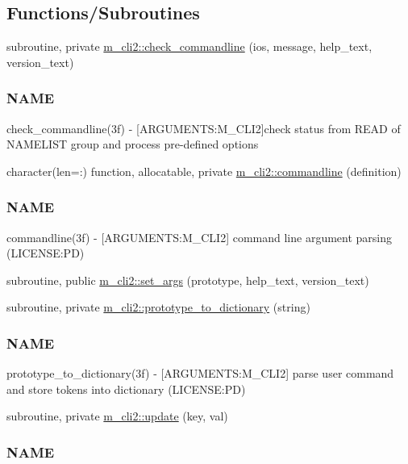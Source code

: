 \subsection*{Functions/\+Subroutines}
\begin{DoxyCompactItemize}
\item 
subroutine, private \mbox{\hyperlink{namespacem__cli2_a02d4639b325d1b8c6fd3b03ba515f2b3}{m\+\_\+cli2\+::check\+\_\+commandline}} (ios, message, help\+\_\+text, version\+\_\+text)
\begin{DoxyCompactList}\small\item\em \subsubsection*{N\+A\+ME}

check\+\_\+commandline(3f) -\/ \mbox{[}A\+R\+G\+U\+M\+E\+N\+TS\+:M\+\_\+\+C\+L\+I2\mbox{]}check status from R\+E\+AD of N\+A\+M\+E\+L\+I\+ST group and process pre-\/defined options \end{DoxyCompactList}\item 
character(len=\+:) function, allocatable, private \mbox{\hyperlink{namespacem__cli2_a85c38a938a7dd9a749daf8effe45c109}{m\+\_\+cli2\+::commandline}} (definition)
\begin{DoxyCompactList}\small\item\em \subsubsection*{N\+A\+ME}

commandline(3f) -\/ \mbox{[}A\+R\+G\+U\+M\+E\+N\+TS\+:M\+\_\+\+C\+L\+I2\mbox{]} command line argument parsing (L\+I\+C\+E\+N\+SE\+:PD) \end{DoxyCompactList}\item 
subroutine, public \mbox{\hyperlink{namespacem__cli2_a6d20994aa80217dd3d0ffd1d5586f736}{m\+\_\+cli2\+::set\+\_\+args}} (prototype, help\+\_\+text, version\+\_\+text)
\item 
subroutine, private \mbox{\hyperlink{namespacem__cli2_a14896d00e509cbc32f4df993a8d6f75b}{m\+\_\+cli2\+::prototype\+\_\+to\+\_\+dictionary}} (string)
\begin{DoxyCompactList}\small\item\em \subsubsection*{N\+A\+ME}

prototype\+\_\+to\+\_\+dictionary(3f) -\/ \mbox{[}A\+R\+G\+U\+M\+E\+N\+TS\+:M\+\_\+\+C\+L\+I2\mbox{]} parse user command and store tokens into dictionary (L\+I\+C\+E\+N\+SE\+:PD) \end{DoxyCompactList}\item 
subroutine, private \mbox{\hyperlink{namespacem__cli2_a160d56bc4a10faef7e8a8a4f04f4dadb}{m\+\_\+cli2\+::update}} (key, val)
\begin{DoxyCompactList}\small\item\em \subsubsection*{N\+A\+ME}


\end{DoxyCompactList}
\end{DoxyCompactItemize}
